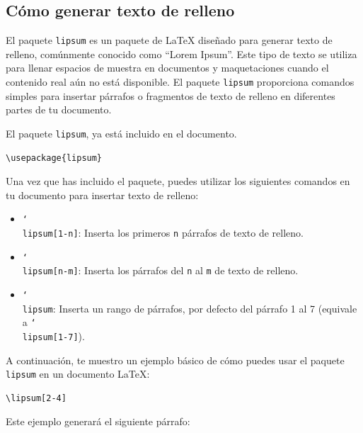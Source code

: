 \documentclass[a4paper,12pt]{report}
\begin{document}
\begin{appendices}
\chapter{Cómo generar texto de relleno}

El paquete \texttt{lipsum} es un paquete de LaTeX diseñado para generar texto de relleno, comúnmente conocido como ``Lorem Ipsum''.
Este tipo de texto se utiliza para llenar espacios de muestra en documentos y maquetaciones cuando el contenido real aún no está disponible. 
El paquete \texttt{lipsum} proporciona comandos simples para insertar párrafos o fragmentos de texto de relleno en diferentes partes de tu documento.

El paquete \texttt{lipsum}, ya está incluido en el documento.

\begin{lstlisting}[language={[LaTeX]TeX},backgroundcolor=\color{gray!10!white}]
\usepackage{lipsum} 
\end{lstlisting}

Una vez que has incluido el paquete, puedes utilizar los siguientes comandos en tu documento para insertar texto de relleno:

\begin{itemize}
  \item \texttt{\char`\\lipsum[1-n]}: Inserta los primeros \texttt{n} párrafos de texto de relleno.
  \item \texttt{\char`\\lipsum[n-m]}: Inserta los párrafos del \texttt{n} al \texttt{m} de texto de relleno.
  \item \texttt{\char`\\lipsum}: Inserta un rango de párrafos, por defecto del párrafo 1 al 7 (equivale a \texttt{\char`\\lipsum[1-7]}).
\end{itemize}

A continuación, te muestro un ejemplo básico de cómo puedes usar el paquete \texttt{lipsum} en un documento \LaTeX{}:

\begin{lstlisting}[language={[LaTeX]TeX},backgroundcolor=\color{gray!10!white}]
\lipsum[2-4] 
\end{lstlisting}
  
Este ejemplo generará el siguiente párrafo:

\lipsum[2-4]

\printglossaries

\end{appendices}
\end{document}
